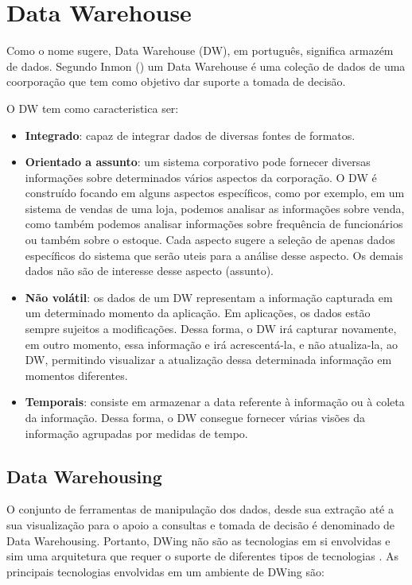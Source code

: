 \chapter{Data Warehouse}

%

Como o nome sugere, Data Warehouse (DW), em português, significa armazém de dados. Segundo Inmon (\citeyear{inmon2002}) um Data Warehouse é uma coleção de dados de uma coorporação que tem como objetivo dar suporte a tomada de decisão.

%

O DW tem como caracteristica ser:

%

\begin{itemize}
\item \textbf{Integrado}: capaz de integrar dados de diversas fontes de formatos.
\item \textbf{Orientado a assunto}: um sistema corporativo pode fornecer diversas informações sobre determinados vários aspectos da corporação. O DW é construído focando em alguns aspectos específicos, como por exemplo, em um sistema de vendas de uma loja, podemos analisar as informações sobre venda, como também podemos analisar informações sobre frequência de funcionários ou também sobre o estoque. Cada aspecto sugere a seleção de apenas dados específicos do sistema que serão uteis para a análise desse aspecto. Os demais dados não são de interesse desse aspecto (assunto).
\item \textbf{Não volátil}: os dados de um DW representam a informação capturada em um determinado momento da aplicação. Em aplicações, os dados estão sempre sujeitos a modificações. Dessa forma, o DW irá capturar novamente, em outro momento, essa informação e irá acrescentá-la, e não atualiza-la, ao DW, permitindo visualizar a atualização dessa determinada informação em momentos diferentes.
\item \textbf{Temporais}: consiste em armazenar a data referente à informação ou à coleta da informação. Dessa forma, o DW consegue fornecer várias visões da informação agrupadas por medidas de tempo. 
\end{itemize}

\section{Data Warehousing}

O conjunto de ferramentas de manipulação dos dados, desde sua extração até a sua visualização para o apoio a consultas e tomada de decisão é denominado de Data Warehousing. Portanto,  DWing não são as tecnologias em si envolvidas e sim uma arquitetura que requer o suporte de diferentes tipos de tecnologias \cite{inmon2002}.  As principais tecnologias envolvidas em um ambiente de DWing são:

